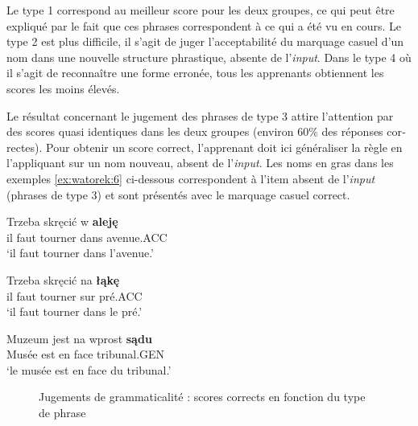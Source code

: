 \documentclass[output=paper]{langscibook}
\begin{document}
\begin{otherlanguage}{french}
Le type 1 correspond au meilleur score pour les deux groupes, ce qui peut être expliqué par le fait que ces phrases correspondent à ce qui a été vu en cours. Le type 2 est plus difficile, il s’agit de juger l’acceptabilité du marquage casuel d’un nom dans une nouvelle structure phrastique, absente de l’\textit{input}. Dans le type 4 où il s’agit de reconnaître une forme erronée, tous les apprenants obtiennent les scores les moins élevés. 

Le résultat concernant le jugement des phrases de type 3 attire l’attention par des scores quasi identiques dans les deux groupes (environ 60\% des réponses correctes). Pour obtenir un score correct, l’apprenant doit ici généraliser la règle en l’appliquant sur un nom nouveau, absent de l’\textit{input}. Les noms en gras dans les exemples \ref{ex:watorek:6} ci-dessous correspondent à l’item absent de l’\textit{input} (phrases de type 3) et sont présentés avec le marquage casuel correct.

\ea%
    \label{ex:watorek:6}
      \ea
         \gll Trzeba   skręcić   w \textbf{aleję}\\
            {il faut} tourner   dans   avenue.ACC\\
            \glt ‘il faut tourner dans l’avenue.’

      \ex
      \gll Trzeba   skręcić   na \textbf{łąkę}\\
            {il faut} tourner  sur  pré.ACC\\
      \glt ‘il faut   tourner dans le pré.’

      \ex
      \gll Muzeum   jest     na wprost \textbf{sądu}\\
            Musée    est    en face    tribunal.GEN\\
      \glt ‘le musée   est     en face du   tribunal.’
      \z
      \z

\begin{figure}
\caption{\label{fig:watorek:4} Jugements de grammaticalité : scores corrects en fonction du type de phrase}
\end{figure}





\end{otherlanguage}
\end{document}
